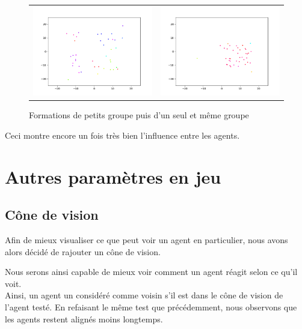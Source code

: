 \documentclass[french, a4paper, 12pt, openany]{report}
\begin{document}
   \begin{figure}[!h]
		\centering
		\begin{tabular}{cc}
			\includegraphics[width=8cm]{images/image_7.png} & \includegraphics[width=8cm]{images/image_9.png} \\
		\end{tabular}
		\caption{Formations de petits groupe puis d'un seul et même groupe}
		\label{mouvement_grp2}
	\end{figure} 
	
	Ceci montre encore un fois très bien l'influence entre les agents.

\section{Autres paramètres en jeu}
	\subsection{Cône de vision}
	
		Afin de mieux visualiser ce que peut voir un agent en particulier, nous avons alors décidé de rajouter un cône de vision.
		
		Nous serons ainsi capable de mieux voir comment un agent réagit selon ce qu'il voit. \\
		
		Ainsi, un agent un considéré comme voisin s'il est dans le cône de vision de l'agent testé. En refaisant le même test que précédemment, nous observons que les agents restent alignés moins longtemps.
		
\end{document}
